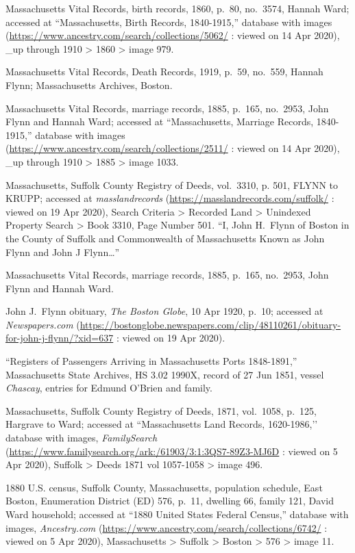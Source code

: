 \begin{thebibliography}{999}
Massachusetts Vital Records, birth records, 1860, p.\ 80, no.\ 3574, Hannah Ward; accessed at ``Massachusetts, Birth Records, 1840-1915,'' database with images (\url{https://www.ancestry.com/search/collections/5062/} : viewed on 14 Apr 2020), \_up through 1910 > 1860 > image 979.

Massachusetts Vital Records, Death Records, 1919, p.\ 59, no.\ 559, Hannah Flynn; Massachusetts Archives, Boston.

Massachusetts Vital Records, marriage records, 1885, p.\ 165, no.\ 2953, John Flynn and Hannah Ward; accessed at ``Massachusetts, Marriage Records, 1840-1915,'' database with images (\url{https://www.ancestry.com/search/collections/2511/} : viewed on 14 Apr 2020), \_up through 1910 > 1885 > image 1033.

Massachusetts, Suffolk County Registry of Deeds, vol.\ 3310, p. 501, FLYNN to KRUPP; accessed at \textit{masslandrecords} (\url{https://masslandrecords.com/suffolk/} : viewed on 19 Apr 2020), Search Criteria >  Recorded Land > Unindexed Property Search > Book 3310, Page Number 501.
``I, John H.\ Flynn of Boston in the County of Suffolk and Commonwealth of Massachusetts Known as John Flynn and John J Flynn\ldots''

Massachusetts Vital Records, marriage records, 1885, p.\ 165, no.\ 2953, John Flynn and Hannah Ward.

John J.\ Flynn obituary, \textit{The Boston Globe}, 10 Apr 1920, p.\ 10; accessed at \textit{Newspapers.com} (\url{https://bostonglobe.newspapers.com/clip/48110261/obituary-for-john-j-flynn/?xid=637} : viewed on 19 Apr 2020).

``Registers of Passengers Arriving in Massachusetts Ports 1848-1891,'' Massachusetts State Archives, HS 3.02 1990X, record of 27 Jun 1851, vessel \textit{Chascay}, entries for Edmund O'Brien and family.

Massachusetts, Suffolk County Registry of Deeds, 1871, vol.\ 1058, p.\ 125, Hargrave to Ward; accessed at ``Massachusetts Land Records, 1620-1986,’’ database with images, \textit{FamilySearch} (\url{https://www.familysearch.org/ark:/61903/3:1:3QS7-89Z3-MJ6D} : viewed on 5 Apr 2020), Suffolk > Deeds 1871 vol 1057-1058 > image 496.

1880 U.S. census, Suffolk County, Massachusetts, population schedule, East Boston, Enumeration District (ED) 576, p.\ 11, dwelling 66, family 121, David Ward household; accessed at ``1880 United States Federal Census,'' database with images, \textit{Ancestry.com} (\url{https://www.ancestry.com/search/collections/6742/} : viewed on 5 Apr 2020), Massachusetts > Suffolk > Boston > 576 > image 11.


\end{thebibliography}
